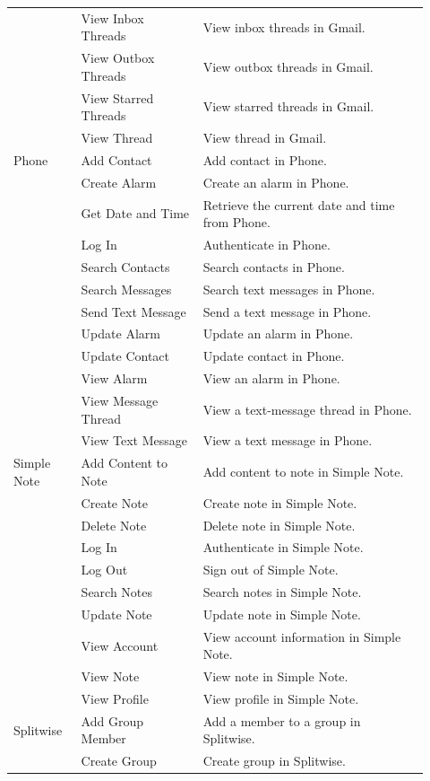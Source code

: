 \documentclass{llmxive}
\begin{document}
\begin{longtable}{@{}p{0.15\linewidth}p{0.27\linewidth}p{0.50\linewidth}@{}}
 & View Inbox Threads & View inbox threads in Gmail. \\
 & View Outbox Threads & View outbox threads in Gmail. \\
 & View Starred Threads & View starred threads in Gmail. \\
 & View Thread & View thread in Gmail. \\
\midrule
Phone & Add Contact & Add contact in Phone. \\
 & Create Alarm & Create an alarm in Phone. \\
 & Get Date and Time & Retrieve the current date and time from Phone. \\
 & Log In & Authenticate in Phone. \\
 & Search Contacts & Search contacts in Phone. \\
 & Search Messages & Search text messages in Phone. \\
 & Send Text Message & Send a text message in Phone. \\
 & Update Alarm & Update an alarm in Phone. \\
 & Update Contact & Update contact in Phone. \\
 & View Alarm & View an alarm in Phone. \\
 & View Message Thread & View a text-message thread in Phone. \\
 & View Text Message & View a text message in Phone. \\
\midrule
Simple Note & Add Content to Note & Add content to note in Simple Note. \\
 & Create Note & Create note in Simple Note. \\
 & Delete Note & Delete note in Simple Note. \\
 & Log In & Authenticate in Simple Note. \\
 & Log Out & Sign out of Simple Note. \\
 & Search Notes & Search notes in Simple Note. \\
 & Update Note & Update note in Simple Note. \\
 & View Account & View account information in Simple Note. \\
 & View Note & View note in Simple Note. \\
 & View Profile & View profile in Simple Note. \\
\midrule
Splitwise & Add Group Member & Add a member to a group in Splitwise. \\
 & Create Group & Create group in Splitwise. \\

\end{longtable}
\end{document}
